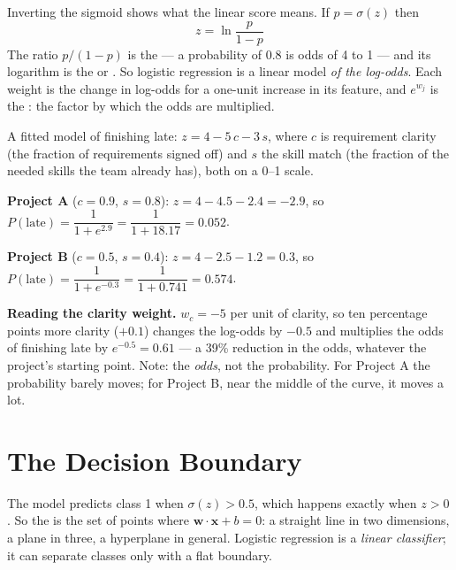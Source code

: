 Inverting the sigmoid shows what the linear score means. If $p = \sigma(z)$ then
\[
z = \ln\frac{p}{1-p}
\]
The ratio $p/(1-p)$ is the  --- a probability of 0.8 is odds of 4 to 1
--- and its logarithm is the  or . So logistic
regression is a linear model \emph{of the log-odds}. Each weight is the change in
log-odds for a one-unit increase in its feature, and $e^{w_j}$ is the
: the factor by which the odds are multiplied.

\begin{worked}
A fitted model of finishing late: $z = 4 - 5\,c - 3\,s$, where $c$ is requirement
clarity (the fraction of requirements signed off) and $s$ the skill match (the
fraction of the needed skills the team already has), both on a 0--1 scale.

\smallskip
\textbf{Project A} ($c = 0.9$, $s = 0.8$):
$z = 4 - 4.5 - 2.4 = -2.9$, so
$P(\text{late}) = \dfrac{1}{1 + e^{2.9}} = \dfrac{1}{1 + 18.17} = \mathbf{0.052}$.

\textbf{Project B} ($c = 0.5$, $s = 0.4$):
$z = 4 - 2.5 - 1.2 = 0.3$, so
$P(\text{late}) = \dfrac{1}{1 + e^{-0.3}} = \dfrac{1}{1 + 0.741} = \mathbf{0.574}$.

\smallskip
\textbf{Reading the clarity weight.} $w_c = -5$ per unit of clarity, so ten
percentage points more clarity ($+0.1$) changes the log-odds by $-0.5$ and
multiplies the odds of finishing late by $e^{-0.5} = \mathbf{0.61}$ --- a 39\%
reduction in the odds, whatever the project's starting point. Note: the
\emph{odds}, not the probability. For Project A the probability barely moves; for
Project B, near the middle of the curve, it moves a lot.
\end{worked}

\section{The Decision Boundary}

The model predicts class 1 when $\sigma(z) > 0.5$, which happens exactly when
$z > 0$. So the  is the set of points where
$\mathbf{w}\cdot\mathbf{x} + b = 0$: a straight line in two dimensions, a plane in
three, a hyperplane in general. Logistic regression is a \emph{linear
classifier}; it can separate classes only with a flat boundary.

